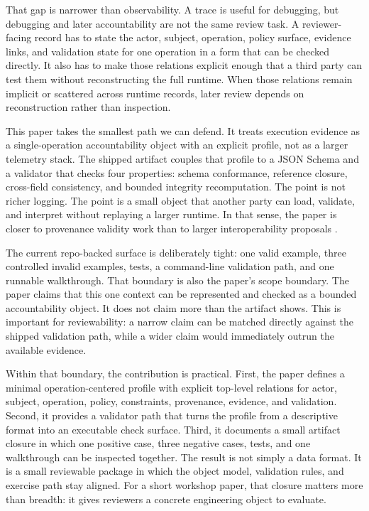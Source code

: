 \documentclass[conference]{IEEEtran}
\begin{document}
That gap is narrower than observability. A trace is useful for debugging, but debugging and later accountability are not the same review task. A reviewer-facing record has to state the actor, subject, operation, policy surface, evidence links, and validation state for one operation in a form that can be checked directly. It also has to make those relations explicit enough that a third party can test them without reconstructing the full runtime. When those relations remain implicit or scattered across runtime records, later review depends on reconstruction rather than inspection.

This paper takes the smallest path we can defend. It treats execution evidence as a single-operation accountability object with an explicit profile, not as a larger telemetry stack. The shipped artifact couples that profile to a JSON Schema and a validator that checks four properties: schema conformance, reference closure, cross-field consistency, and bounded integrity recomputation. The point is not richer logging. The point is a small object that another party can load, validate, and interpret without replaying a larger runtime. In that sense, the paper is closer to provenance validity work than to larger interoperability proposals \cite{moreau2013provdm,cheney2013provconstraints}.

The current repo-backed surface is deliberately tight: one valid example, three controlled invalid examples, tests, a command-line validation path, and one runnable walkthrough. That boundary is also the paper's scope boundary. The paper claims that this one context can be represented and checked as a bounded accountability object. It does not claim more than the artifact shows. This is important for reviewability: a narrow claim can be matched directly against the shipped validation path, while a wider claim would immediately outrun the available evidence.

Within that boundary, the contribution is practical. First, the paper defines a minimal operation-centered profile with explicit top-level relations for actor, subject, operation, policy, constraints, provenance, evidence, and validation. Second, it provides a validator path that turns the profile from a descriptive format into an executable check surface. Third, it documents a small artifact closure in which one positive case, three negative cases, tests, and one walkthrough can be inspected together. The result is not simply a data format. It is a small reviewable package in which the object model, validation rules, and exercise path stay aligned. For a short workshop paper, that closure matters more than breadth: it gives reviewers a concrete engineering object to evaluate.
\end{document}
